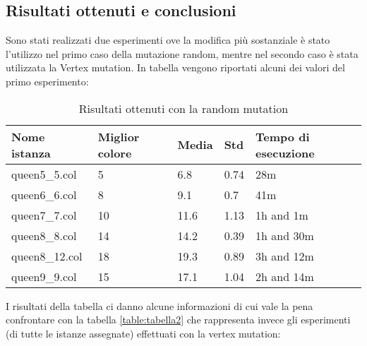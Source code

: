 \documentclass{article}
\begin{document}
\begin{enumerate}
\section{Risultati ottenuti e conclusioni}

Sono stati realizzati due esperimenti ove la modifica più sostanziale è stato l'utilizzo nel primo caso della mutazione random, mentre nel secondo caso è stata utilizzata la Vertex mutation. In tabella vengono riportati alcuni dei valori del primo esperimento:






\begin{table}[htbp]
\begin{center}
\begin{tabular}{|l|l|l|l|l|} 
 \toprule Nome istanza  & Miglior colore & Media & Std  & Tempo di esecuzione \\ 
\midrule
queen5\_5.col  & 5              & 6.8   & 0.74 & 28m                 \\ 
queen6\_6.col  & 8              & 9.1   & 0.7  & 41m                 \\ 
queen7\_7.col  & 10             & 11.6  & 1.13 & 1h and 1m           \\ 
queen8\_8.col  & 14             & 14.2  & 0.39 & 1h and 30m          \\ 
queen8\_12.col & 18             & 19.3  & 0.89 & 3h and 12m          \\ 
queen9\_9.col & 15             & 17.1  & 1.04 & 2h and 14m          \\ 
\bottomrule
\end{tabular}
\caption{\label{table:tabella1}Risultati ottenuti con la random mutation}
\end{center}
\end{table}

\noindent I risultati della tabella ci danno alcune informazioni di cui vale la pena confrontare con la tabella \ref{table:tabella2}  che rappresenta invece gli esperimenti (di tutte le istanze assegnate) effettuati con la vertex mutation:



\end{enumerate}
\end{document}
